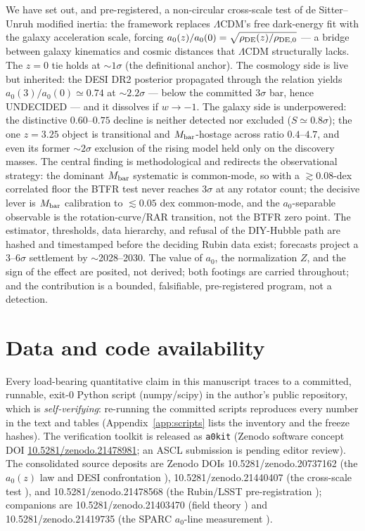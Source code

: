 \documentclass[11pt,a4paper]{article}
\newcommand{\Mbar}{M_{\rm bar}}
\newcommand{\rhoDE}{\rho_{\rm DE}}
\newcommand{\azero}{a_0}
\begin{document}
We have set out, and pre-registered, a non-circular cross-scale test of de
Sitter--Unruh modified inertia: the framework replaces $\Lambda$CDM's free
dark-energy fit with the galaxy acceleration scale, forcing
$\azero(z)/\azero(0)=\sqrt{\rhoDE(z)/\rho_{\rm DE,0}}$ --- a bridge between
galaxy kinematics and cosmic distances that $\Lambda$CDM structurally lacks.
The $z=0$ tie holds at $\sim1\sigma$ (the definitional anchor). The cosmology
side is live but inherited: the DESI DR2 posterior propagated through the
relation yields $\azero(3)/\azero(0)\simeq0.74$ at $\sim2.2\sigma$ --- below
the committed $3\sigma$ bar, hence UNDECIDED --- and it dissolves if
$w\to-1$. The galaxy side is underpowered: the distinctive $0.60$--$0.75$
decline is neither detected nor excluded ($S\simeq0.8\sigma$); the one
$z=3.25$ object is transitional and $\Mbar$-hostage across ratio $0.4$--$4.7$,
and even its former $\sim2\sigma$ exclusion of the rising model held only on
the discovery masses. The central finding is methodological and redirects the
observational strategy: the dominant $\Mbar$ systematic is common-mode, so
with a $\gtrsim0.08$-dex correlated floor the BTFR test never reaches
$3\sigma$ at any rotator count; the decisive lever is $\Mbar$ calibration to
$\lesssim0.05$ dex common-mode, and the $\azero$-separable observable is the
rotation-curve/RAR transition, not the BTFR zero point. The estimator,
thresholds, data hierarchy, and refusal of the DIY-Hubble path are hashed and
timestamped before the deciding Rubin data exist; forecasts project a
$3$--$6\sigma$ settlement by $\sim$2028--2030. The value of $\azero$, the
normalization $Z$, and the sign of the effect are posited, not derived; both
footings are carried throughout; and the contribution is a bounded,
falsifiable, pre-registered program, not a detection.

\section*{Data and code availability}

Every load-bearing quantitative claim in this manuscript traces to a
committed, runnable, exit-0 Python script (numpy/scipy) in the author's
public repository, which is \emph{self-verifying}: re-running the committed
scripts reproduces every number in the text and tables
(Appendix~\ref{app:scripts} lists the inventory and the freeze hashes). The
verification toolkit is released as \texttt{a0kit} (Zenodo software concept
DOI \href{https://doi.org/10.5281/zenodo.21478981}{10.5281/zenodo.21478981};
an ASCL submission is pending editor review). The consolidated source deposits are Zenodo DOIs
10.5281/zenodo.20737162 (the $\azero(z)$ law and DESI confrontation
\cite{Zdesi}), 10.5281/zenodo.21440407 (the cross-scale test \cite{Zcross}),
and 10.5281/zenodo.21478568 (the Rubin/LSST pre-registration \cite{Zprereg});
companions are 10.5281/zenodo.21403470 (field theory \cite{Zmift}) and
10.5281/zenodo.21419735 (the SPARC $\azero$-line measurement \cite{Za0line}).
\end{document}
